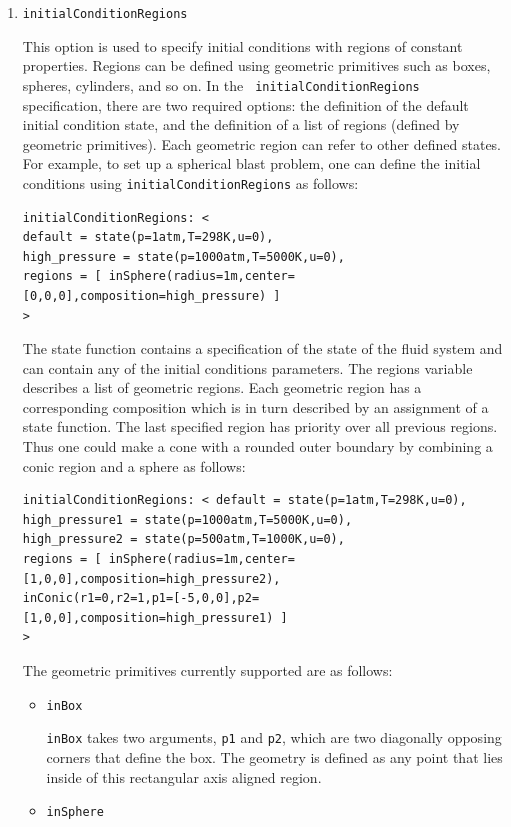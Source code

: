 \documentclass{article}
\begin{document}
\begin{enumerate}
\item {\tt initialConditionRegions}

This option is used to specify initial conditions with regions of
constant properties.  Regions can be defined using geometric
primitives such as boxes, spheres, cylinders, and so on. In the {\tt
  initialConditionRegions } specification, there are two required
options: the definition of the default initial condition state, and
the definition of a list of regions (defined by geometric
primitives).  Each geometric region can refer to other defined
states.  For example, to set up a spherical blast problem, one can
define the initial conditions using {\tt initialConditionRegions} as
follows:

\begin{verbatim}
initialConditionRegions: < 
default = state(p=1atm,T=298K,u=0),
high_pressure = state(p=1000atm,T=5000K,u=0),
regions = [ inSphere(radius=1m,center=[0,0,0],composition=high_pressure) ]
>
\end{verbatim}

The state function contains a specification of the state of the fluid
system and can contain any of the initial conditions parameters.
The regions variable describes a list of
geometric regions.  Each geometric region has a corresponding
composition which is in turn described by an assignment of a state
function.  The last specified region has priority over all previous regions.
Thus one could make a cone with a rounded outer boundary by combining
a conic region and a sphere as follows:

\begin{verbatim}
initialConditionRegions: < default = state(p=1atm,T=298K,u=0),
high_pressure1 = state(p=1000atm,T=5000K,u=0),
high_pressure2 = state(p=500atm,T=1000K,u=0),
regions = [ inSphere(radius=1m,center=[1,0,0],composition=high_pressure2),
inConic(r1=0,r2=1,p1=[-5,0,0],p2=[1,0,0],composition=high_pressure1) ]
>
\end{verbatim}

The geometric primitives currently supported are as follows:

\begin{itemize}
\item {\tt inBox}

{\tt inBox} takes two arguments, {\tt p1} and {\tt p2}, which are two
diagonally opposing corners that define the box.  The geometry is
defined as any point that lies inside of this rectangular axis aligned region.

\item {\tt inSphere}


\end{itemize}
\end{enumerate}
\end{document}
